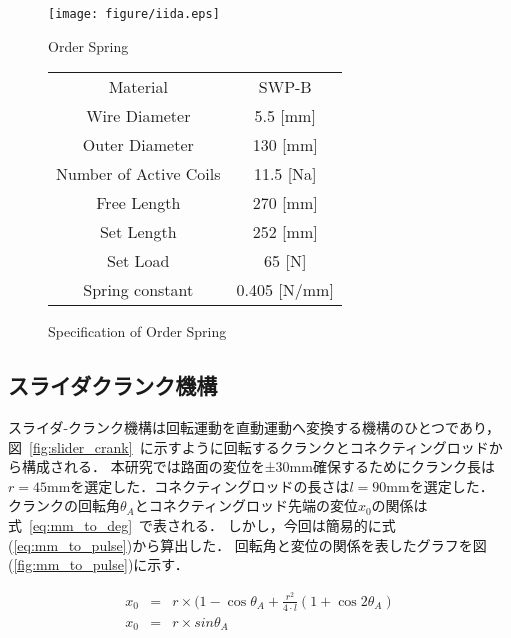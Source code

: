 \documentclass[a4paper,12pt]{article_vdlab_sotsuron}
\begin{document}
\vspace*{10mm}
\begin{figure}[htp]
  \begin{minipage}{0.35\textwidth}
    \begin{center}
      \texttt{[image: figure/iida.eps]}
      \vspace*{3mm}
      \caption{Order Spring}
      \label{fig:iida}
    \end{center}
  \end{minipage}
  \begin{minipage}{0.6\textwidth}
      \begin{center}
	\makeatletter
	\def\@captype{table}
	\makeatother
	\caption{Specification of Order Spring}
	\label{tab:iida}
	  \begin{tabular}{cc}\hline
	    Material & SWP-B \\
	    Wire Diameter & 5.5 [mm] \\
	    Outer Diameter & 130 [mm] \\
	    Number of Active Coils & 11.5 [Na] \\
	    Free Length & 270 [mm] \\
	    Set Length & 252 [mm] \\
	    Set Load & 65 [N]\\
	    Spring constant & 0.405 [N/mm] \\\hline
	  \end{tabular}
	\end{center}
  \end{minipage}
\end{figure}

\newpage
\subsection{スライダクランク機構}
スライダ-クランク機構は回転運動を直動運動へ変換する機構のひとつであり，図~\ref{fig:slider_crank}~に示すように回転するクランクとコネクティングロッドから構成される．
本研究では路面の変位を±30mm確保するためにクランク長は$r=45$mmを選定した．コネクティングロッドの長さは$l=90$mmを選定した．
クランクの回転角$\theta _{A}$とコネクティングロッド先端の変位$x_0$の関係は式~\ref{eq:mm_to_deg}~で表される．
しかし，今回は簡易的に式(\ref{eq:mm_to_pulse})から算出した．
回転角と変位の関係を表したグラフを図(\ref{fig:mm_to_pulse})に示す．


\vspace{0mm}
\begin{eqnarray}
 \label{eq:mm_to_deg}
 {x_0} &=& r\times (1-\cos \theta _{A}+\frac{r^2}{4\cdot l} (1+\cos 2 \theta _{A}) \\
 \label{eq:mm_to_pulse}
 {x_0} &=& r\times sin\theta _{A}
\end{eqnarray}
\end{document}

